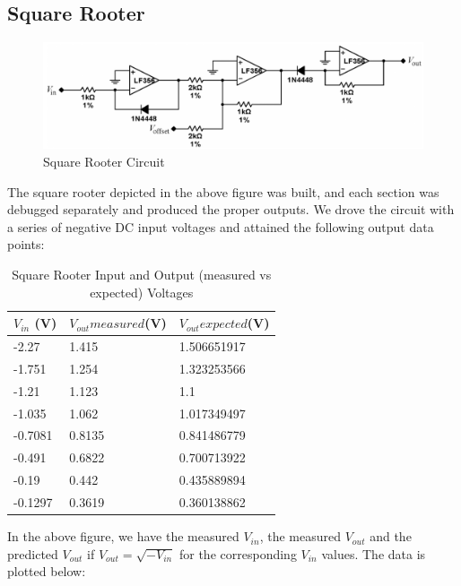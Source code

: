 \documentclass{article}
\begin{document}
    \subsection{Square Rooter}
    \begin{figure}[H]
        \centering
        \includegraphics[scale = 0.6]{11.png}
        \caption{Square Rooter Circuit \cite{lab7}}
        \label{fig:my_label}
    \end{figure}
    The square rooter depicted in the above figure was built, and each section was debugged separately and produced the proper outputs. We drove the circuit with a series of negative DC input voltages and attained the following output data points:
        \begin{table}[H]
            \centering
            \caption{Square Rooter Input and Output (measured vs expected) Voltages}
            \label{my-label}
            \begin{tabular}{lll}
            \textbf{$V_{in}$ (V)} & \textbf{$V_{out}measured$(V)} & \textbf{$V_{out}expected$(V)} \\ \hline
            -2.27 & 1.415 & 1.506651917 \\
            -1.751 & 1.254 & 1.323253566 \\
            -1.21 & 1.123 & 1.1 \\
            -1.035 & 1.062 & 1.017349497 \\
            -0.7081 & 0.8135 & 0.841486779 \\
            -0.491 & 0.6822 & 0.700713922 \\
            -0.19 & 0.442 & 0.435889894 \\
            -0.1297 & 0.3619 & 0.360138862
            \end{tabular}
            \end{table}
    In the above figure, we have the measured $V_{in}$, the measured $V_{out}$ and the predicted $V_{out}$ if $V_{out} = \sqrt{-V_{in}}$ for the corresponding $V_{in}$ values. The data is plotted below:
\end{document}
